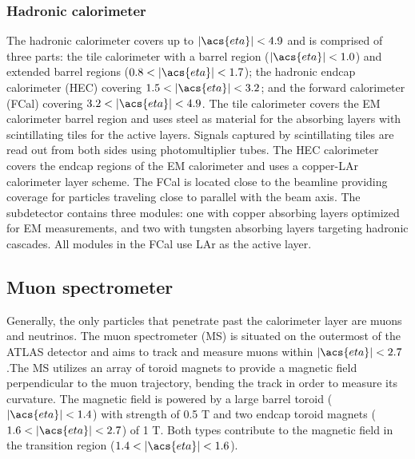 \documentclass[../thesis.tex]{subfiles}
\begin{document}
\subsubsection*{Hadronic calorimeter}
The hadronic calorimeter \citep{atlas} covers up to $|\acs{eta}|<4.9$ and is comprised of three parts: the tile calorimeter with a barrel region ($|\acs{eta}|<1.0$) and extended barrel regions ($0.8<|\acs{eta}|<1.7$); the hadronic endcap calorimeter (\acs{HEC}) covering $1.5<|\acs{eta}|<3.2$; and the forward calorimeter (\acs{FCal}) covering $3.2<|\acs{eta}|<4.9$. The tile calorimeter covers the \acs{EM} calorimeter barrel region and uses steel as material for the absorbing layers with scintillating tiles for the active layers. Signals captured by scintillating tiles are read out from both sides using photomultiplier tubes. The \acs{HEC} calorimeter covers the endcap regions of the \acs{EM} calorimeter and uses a copper-\acs{LAr} calorimeter layer scheme. The \acs{FCal} is located close to the beamline providing coverage for particles traveling close to parallel with the beam axis. The subdetector contains three modules: one with copper absorbing layers optimized for \acs{EM} measurements, and two with tungsten absorbing layers targeting hadronic cascades. All modules in the \acs{FCal} use \acs{LAr} as the active layer.

\subsection{Muon spectrometer}
Generally, the only particles that penetrate past the calorimeter layer are muons and neutrinos. The muon spectrometer (\acs{MS}) \citep{atlas} is situated on the outermost of the ATLAS detector and aims to track and measure muons within $|\acs{eta}|<2.7$.The \acs{MS} utilizes an array of toroid magnets to provide a magnetic field perpendicular to the muon trajectory, bending the track in order to measure its curvature. The magnetic field is powered by a large barrel toroid ($|\acs{eta}|<1.4$) with strength of 0.5 T and two endcap toroid magnets ($1.6<|\acs{eta}|<2.7$) of 1 T. Both types contribute to the magnetic field in the transition region ($1.4<|\acs{eta}|<1.6$).
\end{document}
